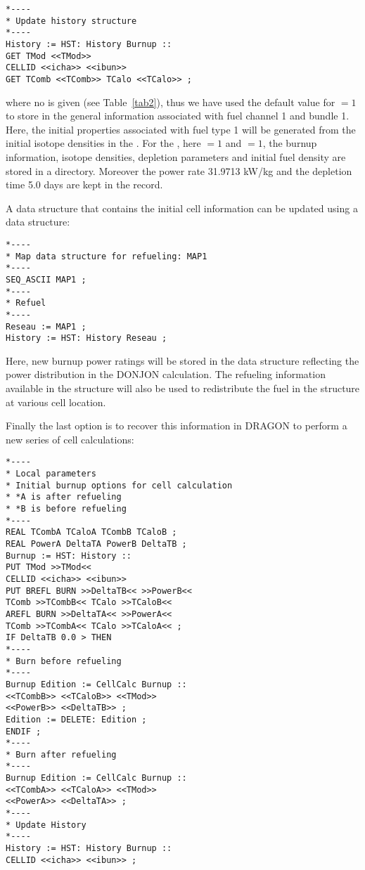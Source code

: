 \begin{verbatim}
*---- 
* Update history structure 
*---- 
History := HST: History Burnup ::
GET TMod <<TMod>> 
CELLID <<icha>> <<ibun>> 
GET TComb <<TComb>> TCalo <<TCalo>> ; 
\end{verbatim}

where no  is given (see Table~\ref{tab2}), thus we have used the default value for $=1$ to store in  the 
general information associated with fuel channel 1 and bundle 1. Here, the initial properties associated with fuel 
type 1 will be generated from the initial isotope densities in the . For the , here $=1$ and 
$=1$, the burnup information, isotope densities, depletion parameters and initial fuel density are stored in a 
 directory. Moreover the power rate 31.9713 kW/kg and the depletion time 5.0 days are kept in the 
 record.

A  data structure that contains the initial cell information can be updated using a  data structure:

\begin{verbatim}
*---- 
* Map data structure for refueling: MAP1 
*---- 
SEQ_ASCII MAP1 ; 
*---- 
* Refuel 
*---- 
Reseau := MAP1 ; 
History := HST: History Reseau ; 
\end{verbatim}

Here, new burnup power ratings will be stored in the  data structure reflecting the power distribution in 
the DONJON calculation. The refueling information available in the  structure will also be used to redistribute 
the fuel in the  structure at various cell location.

Finally the last option is to recover this information in DRAGON to perform a new series of cell calculations:

\begin{verbatim}
*---- 
* Local parameters 
* Initial burnup options for cell calculation 
* *A is after refueling 
* *B is before refueling 
*---- 
REAL TCombA TCaloA TCombB TCaloB ; 
REAL PowerA DeltaTA PowerB DeltaTB ; 
Burnup := HST: History :: 
PUT TMod >>TMod<< 
CELLID <<icha>> <<ibun>> 
PUT BREFL BURN >>DeltaTB<< >>PowerB<< 
TComb >>TCombB<< TCalo >>TCaloB<< 
AREFL BURN >>DeltaTA<< >>PowerA<< 
TComb >>TCombA<< TCalo >>TCaloA<< ; 
IF DeltaTB 0.0 > THEN 
*---- 
* Burn before refueling 
*---- 
Burnup Edition := CellCalc Burnup :: 
<<TCombB>> <<TCaloB>> <<TMod>> 
<<PowerB>> <<DeltaTB>> ; 
Edition := DELETE: Edition ; 
ENDIF ; 
*---- 
* Burn after refueling 
*----
Burnup Edition := CellCalc Burnup :: 
<<TCombA>> <<TCaloA>> <<TMod>> 
<<PowerA>> <<DeltaTA>> ; 
*---- 
* Update History 
*---- 
History := HST: History Burnup :: 
CELLID <<icha>> <<ibun>> ;
\end{verbatim}

